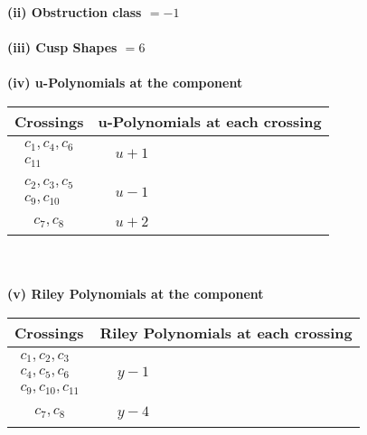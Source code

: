 \documentclass[1p]{elsarticle_modified}
\theoremstyle{definition}
\begin{document}
\flushleft \textbf{(ii) Obstruction class $= -1$}\\~\\
\flushleft \textbf{(iii) Cusp Shapes $= 6$}\\~\\
\newpage\renewcommand{\arraystretch}{1}
\flushleft \textbf{(iv) u-Polynomials at the component}\newline \\
\begin{tabular}{m{50pt}|m{274pt}}
Crossings & \hspace{64pt}u-Polynomials at each crossing \\
\hline $$\begin{aligned}c_{1},c_{4},c_{6}\\c_{11}\end{aligned}$$&$\begin{aligned}
&u+1
\end{aligned}$\\
\hline $$\begin{aligned}c_{2},c_{3},c_{5}\\c_{9},c_{10}\end{aligned}$$&$\begin{aligned}
&u-1
\end{aligned}$\\
\hline $$\begin{aligned}c_{7},c_{8}\end{aligned}$$&$\begin{aligned}
&u+2
\end{aligned}$\\
\hline
\end{tabular}\\~\\
\newpage\renewcommand{\arraystretch}{1}
\flushleft \textbf{(v) Riley Polynomials at the component}\newline \\
\begin{tabular}{m{50pt}|m{274pt}}
Crossings & \hspace{64pt}Riley Polynomials at each crossing \\
\hline $$\begin{aligned}c_{1},c_{2},c_{3}\\c_{4},c_{5},c_{6}\\c_{9},c_{10},c_{11}\end{aligned}$$&$\begin{aligned}
&y-1
\end{aligned}$\\
\hline $$\begin{aligned}c_{7},c_{8}\end{aligned}$$&$\begin{aligned}
&y-4
\end{aligned}$\\
\hline
\end{tabular}\\~\\
\end{document}

